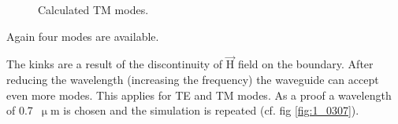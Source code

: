 \begin{figure}[h]%
\centering
\caption{Calculated TM modes.}%
\label{fig:1_TM2}%
\end{figure}
\newpage
Again four modes are available.

The kinks are a result of the discontinuity of $\vec{\mathrm{H}}$ field on the boundary.
After reducing the wavelength (increasing the frequency) the waveguide can accept even more modes. This applies for TE and TM modes. As a proof a wavelength of 0.7~$\upmu$m is chosen and the simulation is repeated (cf. fig \ref{fig:1_0307}).

